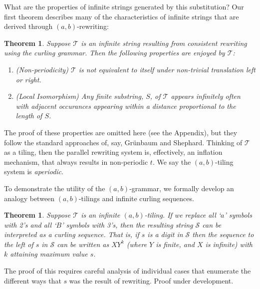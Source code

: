 \documentclass[11pt]{article}
\def\emph#1{{\em #1\/}}
\def\term#1{\emph{#1}}
\newcounter{thm}
\newtheorem{theorem}[thm]{Theorem}
\def\ni{\noindent}
\def\ab{$(a,b)$}
\def\abg{\ab-grammar}
\def\q#1{`$#1$'}
\begin{document}
What are the properties of infinite strings generated by this substitution?  Our first theorem describes many of the characteristics of infinite strings that are derived through \ab-rewriting:
\def\scS{\mathcal{S}}
\def\scT{\mathcal{T}}
\begin{theorem}\label{thm:aperiodic}
Suppose $\scT$ is an infinite string resulting from 
consistent rewriting using the curling grammar.  Then the following properties are enjoyed by $\scT$:
\begin{enumerate}
\item (Non-periodicity) $\scT$ is not equivalent to itself under
non-trivial translation left or right.
\item (Local Isomorphism) Any finite substring, $S$, of $\scT$ appears
infinitely often with adjacent occurances appearing within a distance proportional to the length of $S$.
\end{enumerate}
\end{theorem}
\ni The proof of these properties are omitted here (see the Appendix), but they
follow the standard approaches of, say, Gr\"unbaum and Shephard\cite{Gr87}.
Thinking of $\scT$ as a tiling, then the parallel rewriting system is,
effectively, an inflation mechanism, that always results in non-periodic $t$.  We say the \ab-tiling system is \term{aperiodic}.

To demonstrate the utility of the \abg, we formally develop an analogy
between \ab-tilings and infinite curling sequences.

\begin{theorem}
Suppose $\scT$ is an infinite \ab-tiling.  If we replace all \q{a} symbols with
2's and all \q{B} symbols with 3's, then the resulting string $\scS$ can be
interpreted as a curling sequence.  That is, if $s$ is a digit
in $\scS$ then the sequence to the left of $s$ in $\scS$ can be written as
$XY^k$ (where $Y$ is finite, and $X$ is infinite) with $k$ attaining maximum
value $s$.
\end{theorem}
\ni The proof of this requires careful analysis of individual cases that
enumerate the different ways that $s$ was the result of rewriting. 
Proof under development.
\end{document}
